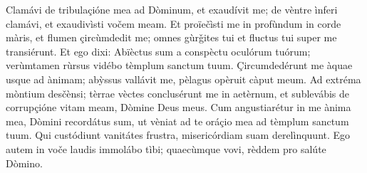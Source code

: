 Clamávi de tribulaçióne mea ad Dòminum, et exaudívit me; de vèntre ìnferi clamávi, et exaudivìsti vočem meam.
Et proïečìsti me in profùndum in corde màris, et flumen çircùmdedit me; omnes gùrǧites tui et fluctus tui super me transiérunt.
Et ego dixi: Abïèctus sum a conspèctu oculórum tuórum; verùmtamen rùrsus vidébo tèmplum sanctum tuum.
Çircumdedérunt me àquae usque ad ànimam; abỳssus vallávit me, pèlagus opèruit càput meum.
Ad extréma mòntium desčènsi; tèrrae vèctes conclusérunt me in aetèrnum, et sublevábis de corrupçióne vitam meam, Dòmine Deus meus.
Cum angustiarétur in me ànima mea, Dòmini recordátus sum, ut vèniat ad te oráçio mea ad tèmplum sanctum tuum.
Qui custódiunt vanitátes frustra, misericórdiam suam derelìnquunt.
Ego autem in voče laudis immolábo tìbi; quaecùmque vovi, rèddem pro salúte Dòmino.
